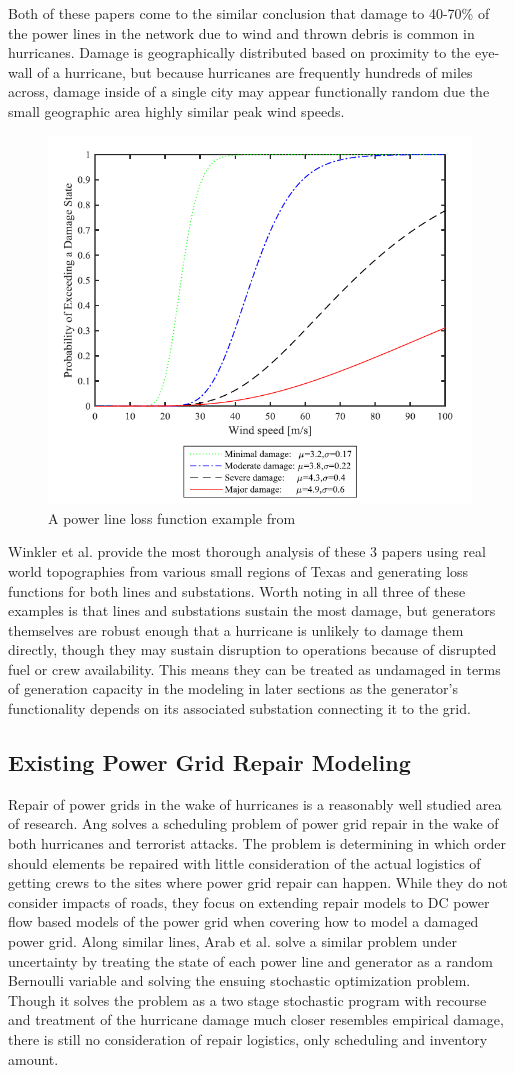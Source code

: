 Both of these papers come to the similar conclusion that damage to 40-70\% of the power lines in the network due to wind and thrown debris is common in hurricanes. Damage is geographically distributed based on proximity to the eye-wall of a hurricane, but because hurricanes are frequently hundreds of miles across, damage inside of a single city may appear functionally random due the small geographic area highly similar peak wind speeds. 

\begin{figure}[htbp]
	\centering
	\includegraphics[width=.5\linewidth]{ScherbFigure.PNG}
	\caption{A power line loss function example from \cite{ScherbEA2015}}
\end{figure}

Winkler et al. \cite{WinklerEA2010} provide the most thorough analysis of these 3 papers using real world topographies from various small regions of Texas and generating loss functions for both lines and substations. Worth noting in all three of these examples is that lines and substations sustain the most damage, but generators themselves are robust enough that a hurricane is unlikely to damage them directly, though they may sustain disruption to operations because of disrupted fuel or crew availability. This means they can be treated as undamaged in terms of generation capacity in the modeling in later sections as the generator's functionality depends on its associated substation connecting it to the grid. 
\subsection{Existing Power Grid Repair Modeling}
Repair of power grids in the wake of hurricanes is a reasonably well studied area of research. Ang \cite{NPSMasters} solves a scheduling problem of power grid repair in the wake of both hurricanes and terrorist attacks. The problem is determining in which order should elements be repaired with little consideration of the actual logistics of getting crews to the sites where power grid repair can happen. While they do not consider impacts of roads, they focus on extending repair models to DC power flow based models of the power grid when covering how to model a damaged power grid. Along similar lines, Arab et al. \cite{ArabEA2015} solve a similar problem under uncertainty by treating the state of each power line and generator as a random Bernoulli variable and solving the ensuing stochastic optimization problem. Though it solves the problem as a two stage stochastic program with recourse and treatment of the hurricane damage much closer resembles empirical damage, there is still no consideration of repair logistics, only scheduling and inventory amount. 

